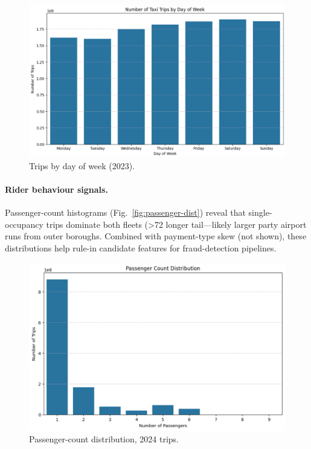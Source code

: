 \documentclass[conference]{IEEEtran}
\begin{document}
\begin{figure}[htbp]
  \centering
  \includegraphics[width=0.9\linewidth]{dow_trips_yellow.png}
  \caption{Trips by day of week (2023).}
  \label{fig:dow}
\end{figure}

\paragraph*{Rider behaviour signals.}
Passenger-count histograms (Fig.~\ref{fig:passenger-dist}) reveal that
single-occupancy trips dominate both fleets (>72 %
longer tail—likely larger party airport runs from outer boroughs.  Combined
with payment-type skew (not shown), these distributions help rule-in candidate
features for fraud-detection pipelines.

\begin{figure}[htbp]
  \centering
  \includegraphics[width=0.9\linewidth]{passenger_count_yellow.png}
  \caption{Passenger-count distribution, 2024 trips.}
  \label{fig:passenger-count-yellow}
\end{figure}
\end{document}
